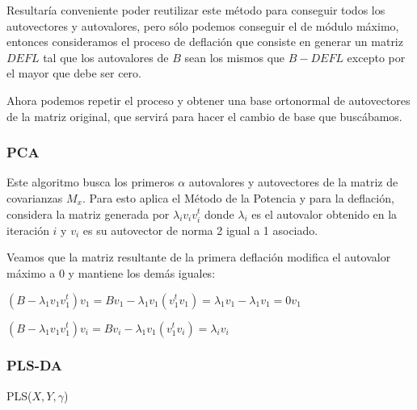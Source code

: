 Resultar\'ia conveniente poder reutilizar este m\'etodo para conseguir todos los autovectores y autovalores, pero s\'olo podemos conseguir el de m\'odulo m\'aximo, entonces consideramos el proceso de deflaci\'on que consiste en generar un matriz $DEFL$ tal que los autovalores de $B$ sean los mismos que $B - DEFL$ excepto por el mayor que debe ser cero.

Ahora podemos repetir el proceso y obtener una base ortonormal de autovectores de la matriz original, que servir\'a para hacer el cambio de base que busc\'abamos.

\subsubsection{PCA}

Este algoritmo busca los primeros $\alpha$ autovalores y autovectores de la matriz de covarianzas $M_{x}$. Para esto aplica el M\'etodo de la Potencia y para la deflaci\'on, considera la matriz generada por $\lambda_{i}v_{i}v_{i}^{t}$ donde $\lambda_{i}$ es el autovalor obtenido en la iteraci\'on $i$ y $v_{i}$ es su autovector de norma 2 igual a 1 asociado.

Veamos que la matriz resultante de la primera deflaci\'on modifica el autovalor m\'aximo a 0 y mantiene los dem\'as iguales:

$(B - \lambda_{1}v_{1}v_{1}^{t})v_{1} = Bv_{1} - \lambda_{1}v_{1}(v_{1}^{t}v_{1}) = \lambda_{1}v_{1} - \lambda_{1}v_{1} = 0v_{1}$

$(B - \lambda_{1}v_{1}v_{1}^{t})v_{i} = Bv_{i} - \lambda_{1}v_{1}(v_{1}^{t}v_{i}) = \lambda_{i}v_{i}$

\subsubsection{PLS-DA}

\begin{algorithm}
\begin{algorithmic}[1]
 
\ENDFOR
{}
\end{algorithmic}
\caption{PLS($X, Y, \gamma$)}
\end{algorithm}

